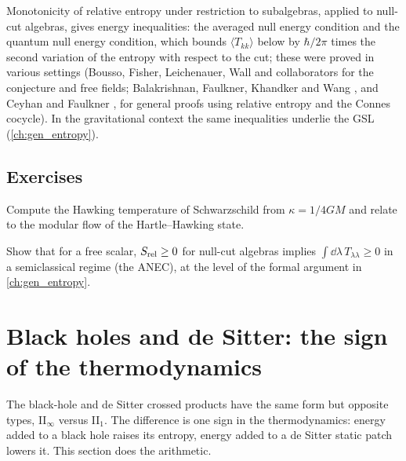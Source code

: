 Monotonicity of relative entropy under restriction to subalgebras, applied to null-cut algebras, gives energy inequalities: the averaged null energy condition and the quantum null energy condition, which bounds $\langle T_{kk}\rangle$ below by $\hbar/2\pi$ times the second variation of the entropy with respect to the cut; these were proved in various settings (Bousso, Fisher, Leichenauer, Wall and collaborators for the conjecture and free fields; Balakrishnan, Faulkner, Khandker and Wang \cite{BFKW2019}, and Ceyhan and Faulkner \cite{CeyhanFaulkner2020}, for general proofs using relative entropy and the Connes cocycle).  In the gravitational context the same inequalities underlie the GSL (\cref{ch:gen_entropy}).

\subsection*{Exercises}
\begin{exercise}\label{ex:curved_hawking:1}
Compute the Hawking temperature of Schwarzschild from $\kappa=1/4GM$ and relate to the modular flow of the Hartle--Hawking state.
\end{exercise}
\begin{exercise}\label{ex:curved_hawking:2}
Show that for a free scalar, $S_{\rm rel}\ge0$ for null-cut algebras implies $\int\dd\lambda\,T_{\lambda\lambda}\ge0$ in a semiclassical regime (the ANEC), at the level of the formal argument in \cref{ch:gen_entropy}.
\end{exercise}


\section{Black holes and de Sitter: the sign of the thermodynamics}\label{ch:bhdS}
\begin{physmotiv}
The black-hole and de Sitter crossed products have the same form but opposite types, II$_\infty$ versus II$_1$. The difference is one sign in the thermodynamics: energy added to a black hole raises its entropy, energy added to a de Sitter static patch lowers it. This section does the arithmetic.
\end{physmotiv}

